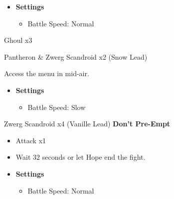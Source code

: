 \begin{paracol}{2}
	\begin{menu}
		\begin{itemize}
			\item \textbf{Settings}
			      \begin{itemize}
				      \item Battle Speed: Normal
			      \end{itemize}
		\end{itemize}
	\end{menu}

	\begin{battle}{Ghoul x3}
	\end{battle}
	\switchcolumn
	\begin{battle}{Pantheron \& Zwerg Scandroid x2 (Snow Lead)}
	\end{battle}

	Access the menu in mid-air.

	\begin{menu}
		\begin{itemize}
			\item \textbf{Settings}
			      \begin{itemize}
				      \item Battle Speed: Slow
			      \end{itemize}
		\end{itemize}
	\end{menu}

	\begin{battle}{Zwerg Scandroid x4 (Vanille Lead) \textbf{Don't Pre-Empt}}
		\begin{itemize}
			\item Attack x1
			\item Wait 32 seconds or let Hope end the fight.
		\end{itemize}
	\end{battle}


	\begin{menu}
		\begin{itemize}
			\item \textbf{Settings}
			      \begin{itemize}
				      \item Battle Speed: Normal
			      \end{itemize}
		\end{itemize}
	\end{menu}


\end{paracol}
